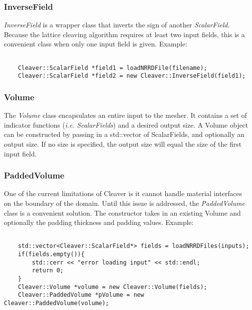 \documentclass[fleqn,12pt,openany]{book}
\begin{document}
\subsubsection{InverseField}
\emph{InverseField} is a wrapper class that inverts the sign of another
\emph{ScalarField}. Because the lattice cleaving algorithm requires at
least two input fields, this is a convenient class when only one input
field is given. Example:

\begin{verbatim}
    
    Cleaver::ScalarField *field1 = loadNRRDFile(filename);
    Cleaver::ScalarField *field2 = new Cleaver::InverseField(field1);
\end{verbatim}


\subsubsection{Volume}

The \emph{Volume} class encapsulates an entire input to the mesher. It
contains a set of indicator functions (\emph{i.e. ScalarFields}) and
a desired output size. A Volume object can be constructed by passing
in a std::vector of ScalarFields, and optionally an output size. If
no size is specified, the output size will equal the size of the first
input field.



\subsubsection{PaddedVolume}

One of the current limitations of Cleaver is it cannot handle material
interfaces on the boundary of the domain. Until this issue is addressed,
the \emph{PaddedVolume} class is a convenient solution. The constructor
takes in an existing Volume and optionally the padding thickness and 
padding values. Example:

\begin{verbatim}
    
    std::vector<Cleaver::ScalarField*> fields = loadNRRDFiles(inputs);
    if(fields.empty()){
        std::cerr << "error loading input" << std::endl;
        return 0;
    }
    Cleaver::Volume *volume = new Cleaver::Volume(fields);
    Cleaver::PaddedVolume *pVolume = new Cleaver::PaddedVolume(volume);
\end{verbatim}
\end{document}
